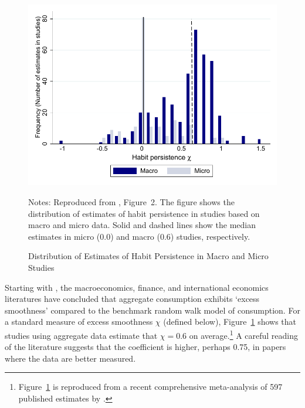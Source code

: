 \documentclass[titlepage]{./econtex}
\begin{document}


\begin{figure}
  \centering
\caption{Distribution of Estimates of Habit Persistence in Macro and Micro Studies}
\label{microMacroMetaHistogram}
    { \includegraphics[width=1.0\textwidth]{./Figures/microMacroMetaHistogram}}

    \begin{flushleft}
      \footnotesize Notes: Reproduced from \cite{hrsHabit}, Figure~2. The figure shows the distribution of estimates of habit persistence in studies based on macro and micro data. Solid and dashed lines show the median estimates in micro (0.0) and macro (0.6) studies, respectively.
      \end{flushleft}
\end{figure}

Starting with \cite{cdSmooth}, the macroeconomics, finance, and international economics literatures have concluded that aggregate consumption exhibits `excess smoothness' compared to the benchmark \cite{hallRandomWalk} random walk model of consumption. For a standard measure of excess smoothness $\chi$ (defined below), Figure~\ref{microMacroMetaHistogram} shows that studies using aggregate data estimate that $\chi=0.6$ on average.\footnote{Figure~\ref{microMacroMetaHistogram} is reproduced from a recent comprehensive meta-analysis of 597 published estimates by \cite{hrsHabit}.} A careful reading of the literature suggests that the coefficient is higher, perhaps 0.75, in papers where the data are better measured.
\end{document}
